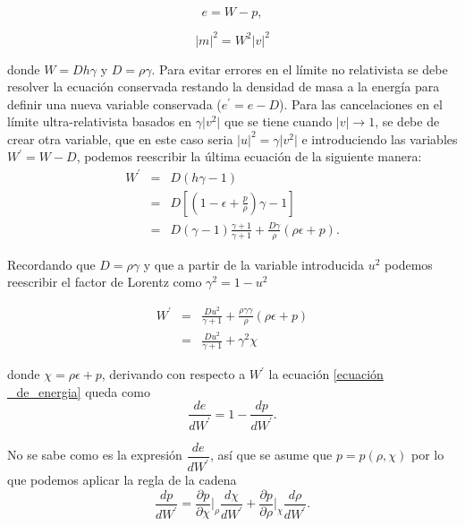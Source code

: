 \documentclass[12pt,a4paper]{book}
\providecommand{\abs}[1]{\lvert#1\rvert} %
\begin{document}
\begin{equation}\label{ecuación  _de_energia}
  e=W-p ,
\end{equation}

\begin{equation}\label{modulos de los momentos}
\abs{m}^2= W^{2}\abs{v}^{2}
\end{equation}

\noindent donde $W=D h \gamma$ y $D=\rho \gamma$. Para evitar errores en el límite no relativista se debe resolver la ecuación conservada restando la densidad de masa 
a la energía para definir una nueva variable conservada ($e^{'}=e-D$). Para las cancelaciones en el límite ultra-relativista basados en $\gamma \abs{v^2}$ que se tiene cuando $\abs{v} \rightarrow 1$, se debe de crear 
otra variable, que en este caso seria $\abs{u}^2=\gamma \abs{v^2}$ e introduciendo las variables $W^{'}=W-D$, podemos reescribir la última ecuación de la siguiente manera:
\begin{eqnarray*}
 W^{'}& = &D(h \gamma -1)\\
&=& D\left[ \left(1-\epsilon+ \frac{p}{\rho}\right) \gamma - 1 \right]\\
&=& D \left(\gamma-1 \right) \frac{\gamma+1}{\gamma+1}+\frac{D \gamma }{\rho}\left(\rho \epsilon + p \right).
\end{eqnarray*}

\noindent Recordando que $D=\rho \gamma$ y que a partir de la variable introducida $u^{2}$ podemos 
reescribir el factor de Lorentz como $\gamma^{2} = 1-u^{2}$

\begin{eqnarray}\label{W_prima}
\nonumber W^{'}&=&\frac{D u^{2}}{\gamma + 1}
+\frac{\rho\gamma \gamma}{ \rho }\left(\rho \epsilon + p \right)\\
&=& \frac{D u^{2}}{\gamma + 1} + \gamma^{2} \chi
\end{eqnarray}

\noindent donde $\chi=\rho \epsilon + p$, derivando con respecto a $W^{'}$ la ecuación \ref{ecuación  _de_energia} queda como
\begin{equation}\label{derivada_E_W}
\dfrac{de}{dW^{'}}=1-\dfrac{dp}{dW^{'}}.
\end{equation}

\noindent No se sabe como es la expresión $\dfrac{de}{dW^{'}}$, así que se asume que $p=p(\rho, \chi)$ por lo que podemos aplicar la regla de la cadena
\begin{equation}\label{cadena}
\dfrac{dp}{dW^{'}}=\dfrac{\partial p}{\partial\chi}\Bigg |_{\rho} \dfrac{d\chi}{dW^{'}} + \dfrac{\partial p}{\partial \rho}\Big |_{\chi} \dfrac{d \rho}{d W^{'}}.
\end{equation}
\end{document}
